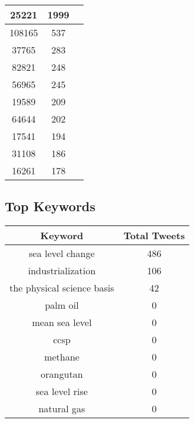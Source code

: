 \documentclass{article}\usepackage[T1]{fontenc}
\begin{document}
\begin{tabular}{|c|c|c|}
 \hline
25221 & 1999\\ 
 \hline
108165 & 537\\ 
 \hline
37765 & 283\\ 
 \hline
82821 & 248\\ 
 \hline
56965 & 245\\ 
 \hline
19589 & 209\\ 
 \hline
64644 & 202\\ 
 \hline
17541 & 194\\ 
 \hline
31108 & 186\\ 
 \hline
16261 & 178\\ 
 \hline
\end{tabular}\subsection*{Top Keywords}\begin{tabular}{|c|c|}         \hline         Keyword & Total Tweets \\ 
 \hline
sea level change & 486\\ 
 \hline
industrialization & 106\\ 
 \hline
the physical science basis & 42\\ 
 \hline
palm oil & 0\\ 
 \hline
mean sea level & 0\\ 
 \hline
ccsp & 0\\ 
 \hline
methane & 0\\ 
 \hline
orangutan & 0\\ 
 \hline
sea level rise & 0\\ 
 \hline
natural gas & 0\\ 
 \hline
\end{tabular}
\end{document}
